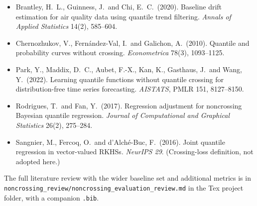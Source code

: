 \documentclass[11pt]{article}
\begin{document}
\begin{itemize}[leftmargin=*,itemsep=2pt]
\item Brantley, H.~L., Guinness, J.\ and Chi, E.~C.\ (2020). Baseline drift estimation for air quality data using quantile trend filtering. \emph{Annals of Applied Statistics} 14(2), 585--604.
\item Chernozhukov, V., Fern\'andez-Val, I.\ and Galichon, A.\ (2010). Quantile and probability curves without crossing. \emph{Econometrica} 78(3), 1093--1125.
\item Park, Y., Maddix, D.~C., Aubet, F.-X., Kan, K., Gasthaus, J.\ and Wang, Y.\ (2022). Learning quantile functions without quantile crossing for distribution-free time series forecasting. \emph{AISTATS}, PMLR 151, 8127--8150.
\item Rodrigues, T.\ and Fan, Y.\ (2017). Regression adjustment for noncrossing Bayesian quantile regression. \emph{Journal of Computational and Graphical Statistics} 26(2), 275--284.
\item Sangnier, M., Fercoq, O.\ and d'Alch\'e-Buc, F.\ (2016). Joint quantile regression in vector-valued RKHSs. \emph{NeurIPS 29}. (Crossing-loss definition, not adopted here.)
\end{itemize}

\noindent The full literature review with the wider baseline set and additional metrics is in \texttt{noncrossing\_review/noncrossing\_evaluation\_review.md} in the Tex project folder, with a companion \texttt{.bib}.
\end{document}
